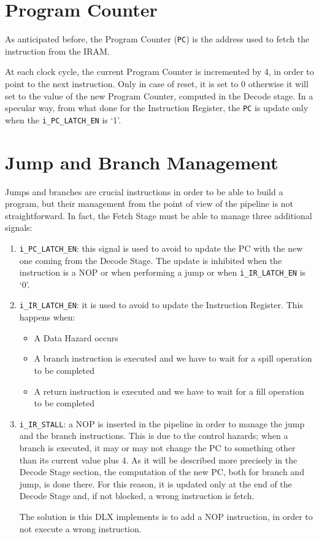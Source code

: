 \section{Program Counter}
As anticipated before, the Program Counter (\texttt{PC}) is the address used to fetch the instruction from the IRAM. 

At each clock cycle, the current Program Counter is incremented by 4, in order to point to the next instruction. Only in case of reset, it is set to 0 otherwise it will set to the value of the new Program Counter, computed in the Decode stage. In a specular way, from what done for the Instruction Register, the \texttt{PC} is update only when the \texttt{i\_PC\_LATCH\_EN} is `1'.

\section{Jump and Branch Management}
\label{sec:jmp_branch}
Jumps and branches are crucial instructions in order to be able to build a program, but their management from the point of view of the pipeline is not straightforward. In fact, the Fetch Stage must be able to manage three additional signals:
\begin{enumerate}
	\item \texttt{i\_PC\_LATCH\_EN}: this signal is used to avoid to update the PC with the new one coming from the Decode Stage. The update is inhibited when the instruction is a NOP or when performing a jump or when \texttt{i\_IR\_LATCH\_EN} is `0'. 
	\item \texttt{i\_IR\_LATCH\_EN}: it is used to avoid to update the Instruction Register. This happens when:
	\begin{itemize}
		\item A Data Hazard occurs
		\item A branch instruction is executed and we have to wait for a spill operation to be completed
		\item A return instruction is executed and we have to wait for a fill operation to be completed
	\end{itemize}
	\item \texttt{i\_IR\_STALL}: a NOP is inserted in the pipeline in order to manage the jump and the branch instructions. This is due to the control hazards; when a branch is executed, it may or may not change the PC to something other than its current value plus 4. As it will be described more precisely in the Decode Stage section, the computation of the new PC, both for branch and jump, is done there. For this reason, it is updated only at the end of the Decode Stage and, if not blocked, a wrong instruction is fetch.
	
	The solution is this DLX implements is to add a NOP instruction, in order to not execute a wrong instruction.
\end{enumerate}
